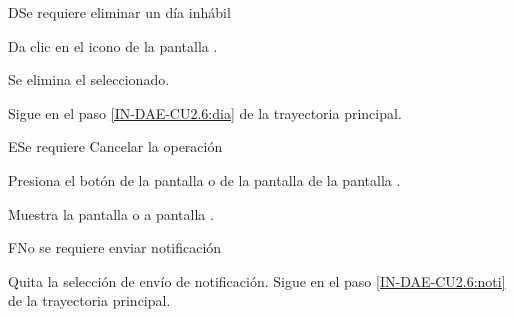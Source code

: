 
\begin{UCtrayectoriaA}{D}{Se requiere eliminar un día inhábil}
	
	\UCpaso [\UCactor] 	Da clic en el icono \IUMenos de la pantalla .

	\UCpaso Se elimina el  seleccionado.
	
	\UCpaso Sigue en el paso \ref{IN-DAE-CU2.6:dia}  de la trayectoria principal.
	
\end{UCtrayectoriaA}


\begin{UCtrayectoriaA}{E}{Se requiere Cancelar la operación}
	
	\UCpaso [\UCactor] 	Presiona el botón  de la pantalla  o de la pantalla de la pantalla .
	
	\UCpaso Muestra la pantalla  o a pantalla .
	
\end{UCtrayectoriaA}


\begin{UCtrayectoriaA}{F}{No se requiere enviar notificación}
	
	\UCpaso [\UCactor] Quita la selección de envío de notificación.
	\UCpaso Sigue en el paso \ref{IN-DAE-CU2.6:noti}  de la trayectoria principal.

\end{UCtrayectoriaA}